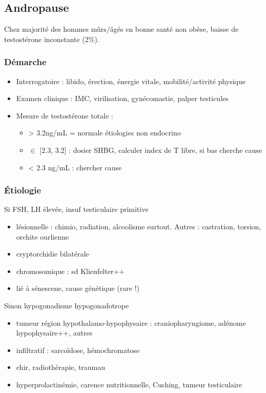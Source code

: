 \documentclass[11pt]{article}
\begin{document}
\subsection{Andropause}
\label{sec:org60611cf}
Chez majorité des hommes mûrs/âgés en bonne santé non obèse, baisse de
testostérone inconstante (2\%).

\subsubsection{Démarche}
\label{sec:org210c178}
\begin{itemize}
\item Interrogatoire : libido, érection, énergie vitale, mobilité/activité physique
\item Examen clinique : IMC, virilisation, gynécomastie, palper testicules
\item Mesure de testostérone totale :
\begin{itemize}
\item > 3.2ng/mL = normale \thus étiologies non endocrino
\item \(\in\) [2.3, 3.2] : dosier SHBG, calculer index de T libre, si bas cherche cause
\item < 2.3 ng/mL : chercher cause
\end{itemize}
\end{itemize}
\subsubsection{Étiologie}
\label{sec:org3a27777}
Si FSH, LH élevée, insuf testiculaire primitive 
\begin{itemize}
\item lésionnelle : chimio, radiation, alcoolisme surtout. Autres : castration,
torsion, orchite ourlienne
\item cryptorchidie bilatérale
\item chromosomique : sd Klienfelter++
\item lié à sénescene, cause génétique (rare !)
\end{itemize}
Sinon hypogonadisme hypogonadotrope 
\begin{itemize}
\item tumeur région hypothalamo-hypophysaire : craniopharyngiome, adénome
hypophysaire++, autres
\item infiltratif : sarcoïdose, hémochromatose
\item chir, radiothérapie, traumau
\item hyperprolactinémie, carence nutritionnelle, Cushing, tumeur testiculaire
\end{itemize}
\end{document}
